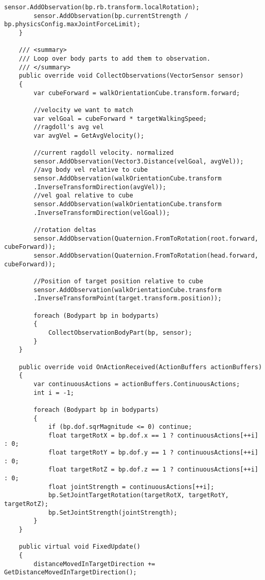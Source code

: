 \begin{lstlisting}[caption={Agenten Skript},captionpos=b,label={lst:skript_agent1}]
        sensor.AddObservation(bp.rb.transform.localRotation);
        sensor.AddObservation(bp.currentStrength / bp.physicsConfig.maxJointForceLimit);
    }

    /// <summary>
    /// Loop over body parts to add them to observation.
    /// </summary>
    public override void CollectObservations(VectorSensor sensor)
    {
        var cubeForward = walkOrientationCube.transform.forward;

        //velocity we want to match
        var velGoal = cubeForward * targetWalkingSpeed;
        //ragdoll's avg vel
        var avgVel = GetAvgVelocity();

        //current ragdoll velocity. normalized
        sensor.AddObservation(Vector3.Distance(velGoal, avgVel));
        //avg body vel relative to cube
        sensor.AddObservation(walkOrientationCube.transform
        .InverseTransformDirection(avgVel));
        //vel goal relative to cube
        sensor.AddObservation(walkOrientationCube.transform
        .InverseTransformDirection(velGoal));

        //rotation deltas
        sensor.AddObservation(Quaternion.FromToRotation(root.forward, cubeForward));
        sensor.AddObservation(Quaternion.FromToRotation(head.forward, cubeForward));

        //Position of target position relative to cube
        sensor.AddObservation(walkOrientationCube.transform
        .InverseTransformPoint(target.transform.position));

        foreach (Bodypart bp in bodyparts)
        {
            CollectObservationBodyPart(bp, sensor);
        }
    }

    public override void OnActionReceived(ActionBuffers actionBuffers)
    {
        var continuousActions = actionBuffers.ContinuousActions;
        int i = -1;

        foreach (Bodypart bp in bodyparts)
        {
            if (bp.dof.sqrMagnitude <= 0) continue;
            float targetRotX = bp.dof.x == 1 ? continuousActions[++i] : 0;
            float targetRotY = bp.dof.y == 1 ? continuousActions[++i] : 0;
            float targetRotZ = bp.dof.z == 1 ? continuousActions[++i] : 0;
            float jointStrength = continuousActions[++i];
            bp.SetJointTargetRotation(targetRotX, targetRotY, targetRotZ);
            bp.SetJointStrength(jointStrength);
        }
    }

    public virtual void FixedUpdate()
    {
        distanceMovedInTargetDirection += GetDistanceMovedInTargetDirection();


\end{lstlisting}
